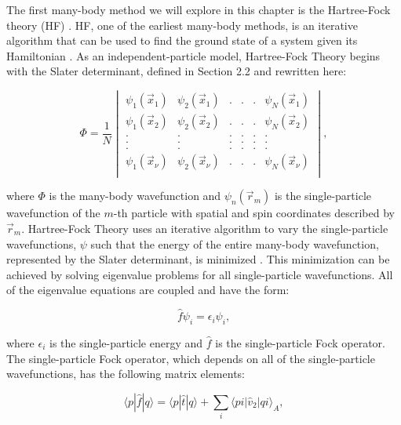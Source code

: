 The first many-body method we will explore in this chapter is the Hartree-Fock theory (HF) \cite{Ref161, Ref162}. HF, one of the earliest many-body methods, is an iterative algorithm that can be used to find the ground state of a system given its Hamiltonian \cite{Ref5}. As an independent-particle model, Hartree-Fock Theory begins with the Slater determinant, defined in Section 2.2 and rewritten here:

\begin{equation}
    \Phi = \frac{1}{N} \begin{vmatrix}
        \psi_1(\vec{x}_1) & \psi_2(\vec{x}_1) & . & . & . & \psi_N(\vec{x}_1) \\
        \psi_1(\vec{x}_2) & \psi_2(\vec{x}_2) & . & . & . & \psi_N(\vec{x}_2) \\
        . & . & . & . & . & . \\
        . & . & . & . & . & . \\
        . & . & . & . & . & . \\
        \psi_1(\vec{x}_\nu) & \psi_2(\vec{x}_\nu) & . & . & . & \psi_N(\vec{x}_\nu) \\
    \end{vmatrix},
\end{equation}

where $\Phi$ is the many-body wavefunction and $\psi_n(\vec{r}_m)$ is the single-particle wavefunction of the $m$-th particle with spatial and spin coordinates described by $\vec{r}_m$. Hartree-Fock Theory uses an iterative algorithm to vary the single-particle wavefunctions, $\psi$ such that the energy of the entire many-body wavefunction, represented by the Slater determinant, is minimized \cite{Ref21}. This minimization can be achieved by solving eigenvalue problems for all single-particle wavefunctions. All of the eigenvalue equations are coupled and have the form:

\begin{equation}
    \hat{f} \psi_i = \epsilon_i \psi_i,
\end{equation}

where $\epsilon_i$ is the single-particle energy and $\hat{f}$ is the single-particle Fock operator.  The single-particle Fock operator, which depends on all of the single-particle wavefunctions, has the following matrix elements:

\begin{equation}
    \langle p | \hat{f} | q \rangle = \langle p | \hat{t} | q \rangle + \sum_i \langle pi | \hat{v}_2 | qi \rangle_{A},
\end{equation}


